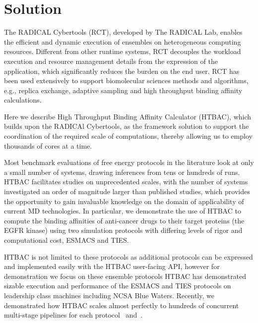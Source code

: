 \documentclass[conference]{IEEEtran}
\begin{document}
\section{Solution}\label{sec:solution}


The RADICAL Cybertools (RCT), developed by The RADICAL Lab, enables the
efficient and dynamic execution of ensembles on heterogeneous computing
resources. Different from other runtime systems, RCT decouples the workload
execution and resource management details from the expression of the
application, which significantly reduces the burden on the end user.
RCT has been used extensively to support
biomolecular sciences methods and algorithms, e.g., replica exchange, adaptive
sampling and high throughput binding affinity calculations.

Here we describe High Throughput Binding Affinity Calculator (HTBAC),
which builds upon the RADICAl Cybertools, as the framework solution to support
the coordination of the required scale of computations, thereby
allowing us to employ thousands of cores at a time.

Most benchmark evaluations of free energy protocols in the literature look
at only a small number of systems, drawing inferences from tens or hundreds
of runs. HTBAC facilitates studies on unprecedented scales, with the number
of systems investigated an order of magnitude larger than published studies,
which provides the opportunity to gain invaluable knowledge on the domain of
applicability of current MD technologies. In particular, we demonstrate the
use of HTBAC to compute the binding affinities of anti-cancer drugs to their
target proteins (the EGFR kinase) using two simulation protocols with differing
levels of rigor and computational cost, ESMACS and TIES.

HTBAC is not limited to these protocols as additional protocols can be
expressed and implemented easily with the HTBAC user-facing API, however for
demonstration we focus on these ensemble protocols HTBAC has demonstrated
sizable execution and performance of the ESMACS and TIES protocols on leadership
class machines including NCSA Blue Waters. Recently, we demonstrated how HTBAC
scales almost perfectly to hundreds of concurrent multi-stage pipelines for each
protocol~\cite{dakka2017} and~\cite{dakka_farkaspall}.
\end{document}
